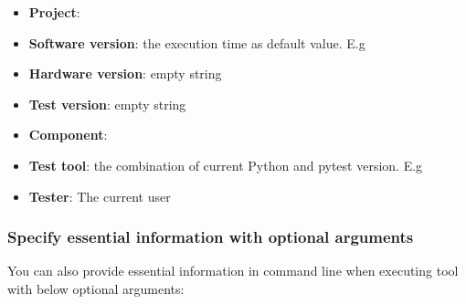 \begin{itemize}
\tightlist
\item
  \textbf{Project}: 
\item
  \textbf{Software version}: the execution time 
   as default value.
   E.g 
\item
  \textbf{Hardware version}: empty string
\item
  \textbf{Test version}: empty string
\item
  \textbf{Component}: 
\item
  \textbf{Test tool}: the combination of current Python and pytest version.
  E.g 
\item
  \textbf{Tester}: The current user
\end{itemize}

  \hypertarget{optional-arguments}{%
  \subsubsection{Specify essential information with optional arguments}
  \label{optional-arguments}}
    You can also provide essential information in command line when executing
    \pkg tool with below optional arguments:

